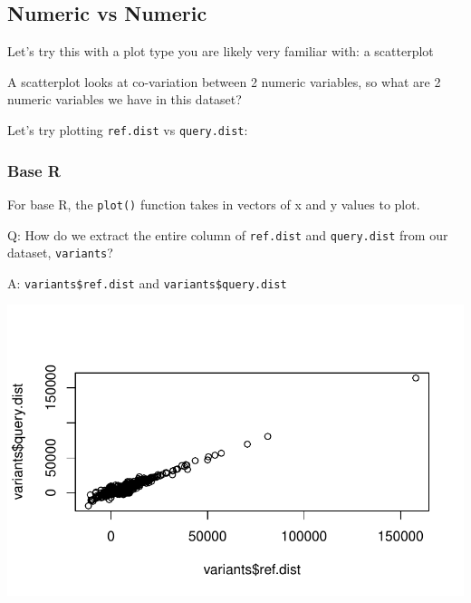 \documentclass[
  letterpaper,
  DIV=11,
  numbers=noendperiod]{scrreprt}
\newenvironment{Shaded}{\begin{snugshade}}{\end{snugshade}}
\newcommand{\AttributeTok}[1]{\textcolor[rgb]{0.40,0.45,0.13}{#1}}
\newcommand{\DocumentationTok}[1]{\textcolor[rgb]{0.37,0.37,0.37}{\textit{#1}}}
\newcommand{\FunctionTok}[1]{\textcolor[rgb]{0.28,0.35,0.67}{#1}}
\newcommand{\NormalTok}[1]{\textcolor[rgb]{0.00,0.23,0.31}{#1}}
\newcommand{\SpecialCharTok}[1]{\textcolor[rgb]{0.37,0.37,0.37}{#1}}
\begin{document}
\subsection{Numeric vs Numeric}\label{numeric-vs-numeric}

Let's try this with a plot type you are likely very familiar with: a
scatterplot

A scatterplot looks at co-variation between 2 numeric variables, so what
are 2 numeric variables we have in this dataset?

Let's try plotting \texttt{ref.dist} vs \texttt{query.dist}:

\subsubsection{Base R}\label{base-r}

For base R, the \texttt{plot()} function takes in vectors of x and y
values to plot.

Q: How do we extract the entire column of \texttt{ref.dist} and
\texttt{query.dist} from our dataset, \texttt{variants}?

A: \texttt{variants\$ref.dist} and \texttt{variants\$query.dist}

\begin{Shaded}
\end{Shaded}

\includegraphics{scripts/02_dataViz/class3_files/figure-pdf/unnamed-chunk-3-1.pdf}
\end{document}
